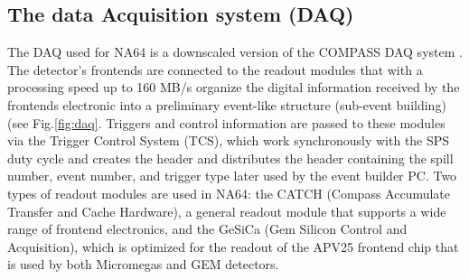 \subsection{The data Acquisition system (DAQ)}
\label{ch2:sec:daq}

The DAQ used for NA64 is a downscaled version of the COMPASS DAQ system \cite{Bodlak_2013,COMPASS-daq}. The detector's frontends are connected to the readout modules that with a processing speed up to 160 MB/s organize the digital information received by the frontends electronic into a preliminary event-like structure (sub-event building) (see Fig.\ref{fig:daq}. Triggers and control information are passed to these modules via the Trigger Control System (TCS), which work synchronously with the SPS duty cycle and creates the header and distributes the header containing the spill number, event number, and trigger type later used by the event builder PC. Two types of readout modules are used in NA64: the CATCH (Compass Accumulate Transfer and Cache Hardware), a general readout module that supports a wide range of frontend electronics, and the GeSiCa (Gem Silicon Control and Acquisition), which is optimized for the readout of the APV25 frontend chip that is used by both Micromegas and GEM detectors.

